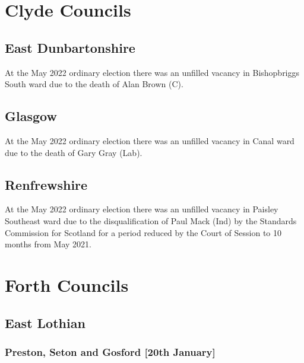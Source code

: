 \documentclass[a4paper,openany]{book}
\begin{document}
\begin{resultsiii}
\section{Clyde Councils}

\subsection*{East Dunbartonshire}

At the May 2022 ordinary election there was an unfilled vacancy in Bishopbriggs South ward due to the death of Alan Brown (C).%

\subsection*{Glasgow}

At the May 2022 ordinary election there was an unfilled vacancy in Canal ward due to the death of Gary Gray (Lab).%

\subsection*{Renfrewshire}

At the May 2022 ordinary election there was an unfilled vacancy in Paisley Southeast ward due to the disqualification of Paul Mack (Ind) by the Standards Commission for Scotland for a period reduced by the Court of Session to 10 months from May 2021.%

\section{Forth Councils}

\subsection*{East Lothian}

\subsubsection*{Preston, Seton and Gosford \hspace*{\fill}\nolinebreak[1]%
	\enspace\hspace*{\fill}
	[20th January]}


\end{resultsiii}
\end{document}
